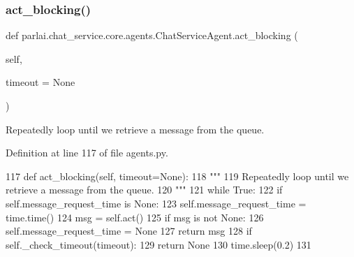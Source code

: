 \subsubsection{\texorpdfstring{act\+\_\+blocking()}{act\_blocking()}}
{\footnotesize\ttfamily def parlai.\+chat\+\_\+service.\+core.\+agents.\+Chat\+Service\+Agent.\+act\+\_\+blocking (\begin{DoxyParamCaption}\item[{}]{self,  }\item[{}]{timeout = {\ttfamily None} }\end{DoxyParamCaption})}

\begin{DoxyVerb}Repeatedly loop until we retrieve a message from the queue.
\end{DoxyVerb}
 

Definition at line 117 of file agents.\+py.


\begin{DoxyCode}
117     \textcolor{keyword}{def }act\_blocking(self, timeout=None):
118         \textcolor{stringliteral}{"""}
119 \textcolor{stringliteral}{        Repeatedly loop until we retrieve a message from the queue.}
120 \textcolor{stringliteral}{        """}
121         \textcolor{keywordflow}{while} \textcolor{keyword}{True}:
122             \textcolor{keywordflow}{if} self.message\_request\_time \textcolor{keywordflow}{is} \textcolor{keywordtype}{None}:
123                 self.message\_request\_time = time.time()
124             msg = self.act()
125             \textcolor{keywordflow}{if} msg \textcolor{keywordflow}{is} \textcolor{keywordflow}{not} \textcolor{keywordtype}{None}:
126                 self.message\_request\_time = \textcolor{keywordtype}{None}
127                 \textcolor{keywordflow}{return} msg
128             \textcolor{keywordflow}{if} self.\_check\_timeout(timeout):
129                 \textcolor{keywordflow}{return} \textcolor{keywordtype}{None}
130             time.sleep(0.2)
131 
\end{DoxyCode}
\mbox{\label{classparlai_1_1chat__service_1_1core_1_1agents_1_1ChatServiceAgent_afcc6a8b904305b7b34d47ddfa99327ef}} 

